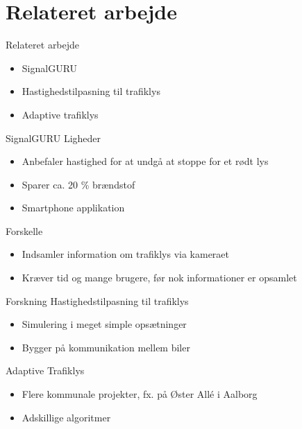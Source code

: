 \section{Relateret arbejde}
\begin{frame}{Relateret arbejde}
\begin{itemize}
\item SignalGURU
\item Hastighedstilpasning til trafiklys
\item Adaptive trafiklys
\end{itemize}
\end{frame}

\begin{frame}{SignalGURU}
Ligheder
\begin{itemize}
	\item Anbefaler hastighed for at undgå at stoppe for et rødt lys
	\item Sparer ca. 20 \% brændstof
	\item Smartphone applikation
\end{itemize}
\vspace{5mm}
Forskelle
\begin{itemize}
	\item Indsamler information om trafiklys via kameraet
	\item Kræver tid og mange brugere, før nok informationer er opsamlet
\end{itemize}
\vspace{5mm}
\end{frame}

\begin{frame}{Forskning}
Hastighedstilpasning til trafiklys
\begin{itemize}
	\item Simulering i meget simple opsætninger
	\item Bygger på kommunikation mellem biler
\end{itemize}

\vspace{5mm}
Adaptive Trafiklys
\begin{itemize}
	\item Flere kommunale projekter, fx. på Øster Allé i Aalborg
	\item Adskillige algoritmer
\end{itemize}
\end{frame}